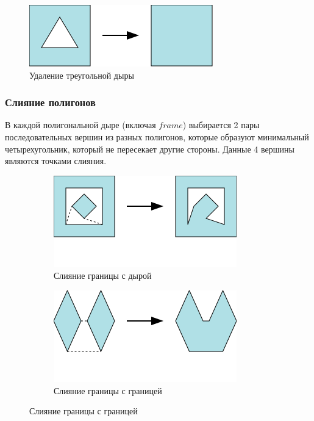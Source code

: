 \documentclass{fefu_thesis/cls/fefu}
\begin{document}
    \begin{figure}[H]
        \centering
        \includegraphics[scale=1]{images/remove_triangular_hole.png}
        \caption{Удаление треугольной дыры}
    \end{figure}

    \subsubsection{Слияние полигонов}
    В каждой полигональной дыре (включая $frame$) выбирается 2 пары последовательных вершин из разных полигонов, которые образуют минимальный четырехугольник, который не пересекает другие стороны. Данные 4 вершины являются точками слияния.

    \begin{figure}[H]
        \centering
        \begin{subfigure}[t]{\linewidth}
            \centering
            \includegraphics[scale=1]{images/polygonmerge.png}
            \caption{Слияние границы с дырой}
        \end{subfigure}
        \begin{subfigure}[t]{\linewidth}
            \centering
            \includegraphics[scale=1]{images/polygonmerge2.png}
            \caption{Слияние границы с границей}
        \end{subfigure}
    \end{figure}
\end{document}
